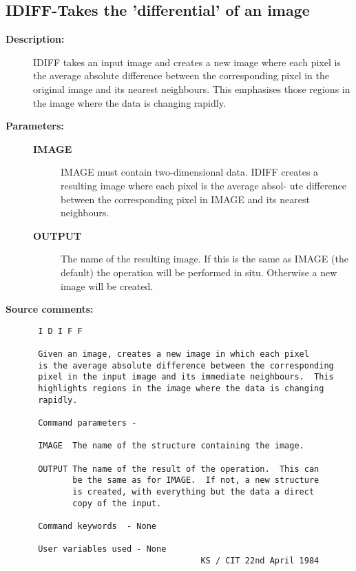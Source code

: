 \subsection{IDIFF-\label{IDIFF}Takes the 'differential' of an image}
\begin{description}

\item [{\bf Description:}]
 IDIFF takes an input image and creates a new image where each pixel
 is the average absolute difference between the corresponding pixel
 in the original image and its nearest neighbours.  This emphasises
 those regions in the image where the data is changing rapidly.

\item [{\bf Parameters:}]
\begin{description}
\item [{\bf IMAGE}]
 IMAGE must contain two-dimensional data.  IDIFF creates
 a resulting image where each pixel is the average absol-
 ute difference between the corresponding pixel in IMAGE
 and its nearest neighbours.
\item [{\bf OUTPUT}]
 The name of the resulting image.  If this is the
 same as IMAGE (the default) the operation will be
 performed in situ.  Otherwise a new image will be
 created.
\end{description}

\item [{\bf Source comments:}]
\begin{verbatim}
 I D I F F

 Given an image, creates a new image in which each pixel
 is the average absolute difference between the corresponding
 pixel in the input image and its immediate neighbours.  This
 highlights regions in the image where the data is changing
 rapidly.

 Command parameters -

 IMAGE  The name of the structure containing the image.

 OUTPUT The name of the result of the operation.  This can
        be the same as for IMAGE.  If not, a new structure
        is created, with everything but the data a direct
        copy of the input.

 Command keywords  - None

 User variables used - None
                                  KS / CIT 22nd April 1984
\end{verbatim}
\end{description}
